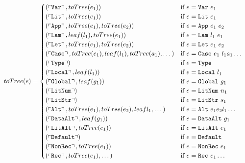 \begin{figure}
  \begin{align*}
    toTree(e) &=
    \begin{cases}
      (\feature{\CVar}, toTree(e_1))                                 & \text{if $e = \CVar\ e_1$} \\
      (\feature{\CLit}, toTree(e_1))                                 & \text{if $e = \CLit\ e_1$} \\
      (\feature{\CApp}, toTree(e_1), toTree(e_2))                    & \text{if $e = \CApp\ e_1\ e_2$} \\
      (\feature{\CLam}, leaf(l_1), toTree(e_1))                      & \text{if $e = \CLam\ l_1\ e_1$} \\
      (\feature{\CLet}, toTree(e_1), toTree(e_2))                    & \text{if $e = \CLet\ e_1\ e_2$} \\
      (\feature{\CCase}, toTree(e_1), leaf(l_1), toTree(a_1), \dots) & \text{if $e = \CCase\ e_1\ l_1 a_1 \dots$} \\
      (\feature{\CType})                                            & \text{if $e = \CType$} \\
      (\feature{\CLocal}, leaf(l_1))                                & \text{if $e = \CLocal\ l_1$} \\
      (\feature{\CGlobal}, leaf(g_1))                               & \text{if $e = \CGlobal\ g_1$} \\
      (\feature{\CLitNum})                                          & \text{if $e = \CLitNum\ n_1$} \\
      (\feature{\CLitStr})                                          & \text{if $e = \CLitStr\ s_1$} \\
      (\feature{\CAlt}, toTree(e_1), toTree(e_2), leaf{l_1}, \dots)  & \text{if $e = \CAlt\ e_1 e_2 l_1 \dots$}  \\
      (\feature{\CDataAlt}, leaf(g_1))                              & \text{if $e = \CDataAlt\ g_1$}  \\
      (\feature{\CLitAlt}, toTree(e_1))                             & \text{if $e = \CLitAlt\ e_1$}  \\
      (\feature{\CDefault})                                         & \text{if $e = \CDefault$}  \\
      (\feature{\CNonRec}, toTree(e_1))                             & \text{if $e = \CNonRec\ e_1$}  \\
      (\feature{\CRec}, toTree(e_1), \dots)                         & \text{if $e = \CRec\ e_1 \dots$} \\

\end{cases}
\end{align*}
\end{figure}
